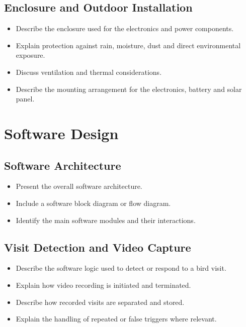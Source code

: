 \subsection{Enclosure and Outdoor Installation}
\label{subsec:EnclosureOutdoorDesign}

\begin{itemize}
    \item Describe the enclosure used for the electronics and power components.
    \item Explain protection against rain, moisture, dust and direct environmental exposure.
    \item Discuss ventilation and thermal considerations.
    \item Describe the mounting arrangement for the electronics, battery and solar panel.
\end{itemize}


\section{Software Design}
\label{sec:SoftwareDesign}

\subsection{Software Architecture}
\label{subsec:SoftwareArchitecture}

\begin{itemize}
    \item Present the overall software architecture.
    \item Include a software block diagram or flow diagram.
    \item Identify the main software modules and their interactions.
\end{itemize}


\subsection{Visit Detection and Video Capture}
\label{subsec:VisitDetectionVideoCapture}

\begin{itemize}
    \item Describe the software logic used to detect or respond to a bird visit.
    \item Explain how video recording is initiated and terminated.
    \item Describe how recorded visits are separated and stored.
    \item Explain the handling of repeated or false triggers where relevant.
\end{itemize}


